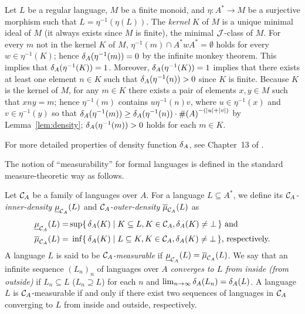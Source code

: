 \begin{remark}\label{rem:kernel}
Let \(L\) be a regular language, \(M\) be a finite monoid, and 
\(\eta\colon A^* \rightarrow M\) be a surjective morphism such that \(L = \eta^{-1}(\eta(L))\).
The \emph{kernel} \(K\) of \(M\) is a unique minimal ideal of \(M\) (it always exists since \(M\) is finite), \ie the minimal \(\mathrel{\cal J}\)-class of \(M\).
For every \(m\) not in the kernel \(K\) of \(M\),
\(\eta^{-1}(m) \cap A^* w A^* = \emptyset\) holds for every \(w \in \eta^{-1}(K)\); hence \(\delta_{A}(\eta^{-1}(m)) = 0\) by the infinite monkey theorem.
This implies that \(\delta_{A}(\eta^{-1}(K)) = 1\).
Moreover, \(\delta_{A}(\eta^{-1}(K)) = 1\) implies that there exists at least one element \(n \in K\) such that \(\delta_{A}(\eta^{-1}(n)) > 0\) since \(K\) is finite.
Because \(K\) is the kernel of \(M\), for any \(m \in K\) there exists a pair of 
elements \(x, y \in M\) such that \(xny = m\); hence \(\eta^{-1}(m)\) contains \(u \eta^{-1}(n) v\), where \(u \in \eta^{-1}(x)\) and \(v \in \eta^{-1}(y)\) so that
\(\delta_{A}(\eta^{-1}(m)) \geq \delta_{A}(\eta^{-1}(n)) \cdot \#\!\left(A\right)^{-(|u|+|v|)}\) by Lemma~\ref{lem:density}; \ie \(\delta_{A}(\eta^{-1}(m)) > 0\) holds for each \(m \in K\).
\end{remark}
For more detailed properties of density function \(\delta_{A}\), see Chapter~13 of \cite{codes}.

The notion of ``measurability'' for formal languages is defined in the standard measure-theoretic way as follows.
\begin{definition}[\cite{S2021}]\upshape
Let \({\cal C}_A\) be a family of languages over \(A\).
For a language \(L \subseteq A^*\), we define its
 \emph{\({\cal C}_A\)-inner-density} \(\underline{\mu}_{{\cal C}_A}(L)\)
 and \emph{\({\cal C}_A\)-outer-density} \(\overline{\mu}_{{\cal C}_A}(L)\)
 as
 \[
 \begin{alignedat}{2}
  \plm{\CC_A}(L) &\defeq& \, \sup &\set{\cd(K)}{K \subseteq L, K \in \CC_A, \cd(K) \neq \bot} \text{ and }\\
  \pum{\CC_A}(L) &\defeq& \inf &\set{\cd(K)}{L \subseteq K, K \in \CC_A, \cd(K) \neq \bot} \text{, respectively.}
 \end{alignedat}
 \]
A language \(L\) is said to be
 \emph{\({\cal C}_A\)-measurable} if
 \(\underline{\mu}_{{\cal C}_A}(L) = \overline{\mu}_{{\cal C}_A}(L)\).
 We say that an infinite sequence \((L_n)_n\) of languages over \(A\)
 {\em converges to \(L\) from inside ({\em \resp}from outside)} if
 \(L_n \subseteq L\) (\resp \(L_n \supseteq L\)) for each \(n\) and \(\lim_{n \rightarrow \infty}\delta_{A}(L_n) = \delta_{A}(L)\).
A language \(L\) is \({\cal C}_A\)-measurable if and only if
there exist two sequences of languages in \({\cal C}_A\) converging to \(L\) from inside and outside, respectively.
\end{definition}

